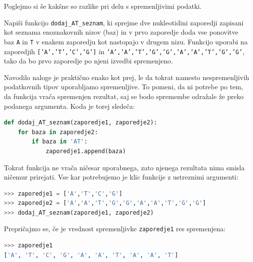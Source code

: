 Poglejmo si še kakšne so razlike pri delu s spremenljivimi podatki.
\begin{zgled}
Napiši funkcijo \texttt{dodaj\_AT\_seznam}, ki sprejme dve nukleotidini zaporedji zapisani kot seznama enoznakovnih nizov (baz) in v prvo zaporedje doda vse ponovitve baz \texttt{A} in \texttt{T} v enakem zaporedju kot nastopajo v drugem nizu. Funkcijo uporabi na zaporedjih \texttt{['A','T','C','G']} in \texttt{'A','A','T','G','G','A','A','T','G','G'}, tako da bo prvo zaporedje po njeni izvedbi spremenjeno.
\end{zgled}
\begin{resitev}
Navodilo naloge je praktično enako kot prej, le da tokrat namesto nespremenljivih podatkovnih tipov uporabljamo spremenljive. To pomeni, da ni potrebe po tem, da funkcija vrača spremenjen rezultat, saj se bodo spremembe odražale že preko podanega argumenta. Koda je torej sledeča:
\begin{lstlisting}[language=Python]
def dodaj_AT_seznam(zaporedje1, zaporedje2):
    for baza in zaporedje2:
        if baza in 'AT':
            zaporedje1.append(baza)
\end{lstlisting}
Tokrat funkcija ne vrača ničesar uporabnega, zato njenega rezultata nima smisla ničemur prirejati. Vse kar potrebujemo je klic funkcije z ustreznimi argumenti:
\begin{lstlisting}[language=Python]
>>> zaporedje1 = ['A','T','C','G']
>>> zaporedje2 = ['A','A','T','G','G','A','A','T','G','G']
>>> dodaj_AT_seznam(zaporedje1, zaporedje2) 
\end{lstlisting}
Prepričajmo se, če je vrednost spremenljivke \texttt{zaporedje1} res spremenjena:
\begin{lstlisting}[language=Python]
>>> zaporedje1
['A', 'T', 'C', 'G', 'A', 'A', 'T', 'A', 'A', 'T']
\end{lstlisting}




\end{resitev}